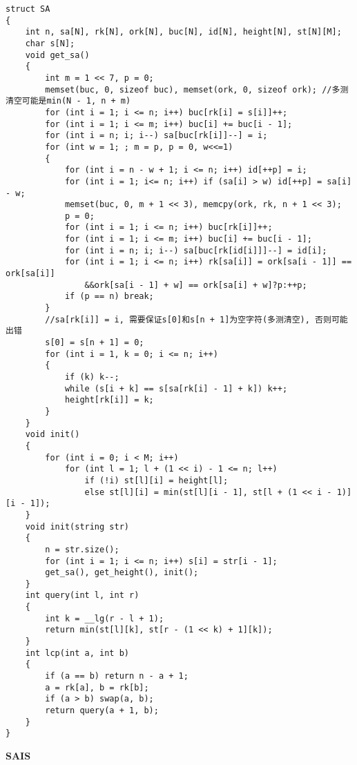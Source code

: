 \documentclass[a4paper, fontset=none]{ctexart}
\begin{document}
\begin{verbatim}
struct SA
{
    int n, sa[N], rk[N], ork[N], buc[N], id[N], height[N], st[N][M];
    char s[N];
    void get_sa()
    {
        int m = 1 << 7, p = 0;
        memset(buc, 0, sizeof buc), memset(ork, 0, sizeof ork); //多测清空可能是min(N - 1, n + m)
        for (int i = 1; i <= n; i++) buc[rk[i] = s[i]]++;
        for (int i = 1; i <= m; i++) buc[i] += buc[i - 1];
        for (int i = n; i; i--) sa[buc[rk[i]]--] = i;
        for (int w = 1; ; m = p, p = 0, w<<=1)
        {
            for (int i = n - w + 1; i <= n; i++) id[++p] = i;
            for (int i = 1; i<= n; i++) if (sa[i] > w) id[++p] = sa[i] - w;
            memset(buc, 0, m + 1 << 3), memcpy(ork, rk, n + 1 << 3);
            p = 0;
            for (int i = 1; i <= n; i++) buc[rk[i]]++;
            for (int i = 1; i <= m; i++) buc[i] += buc[i - 1];
            for (int i = n; i; i--) sa[buc[rk[id[i]]]--] = id[i];
            for (int i = 1; i <= n; i++) rk[sa[i]] = ork[sa[i - 1]] == ork[sa[i]]
                &&ork[sa[i - 1] + w] == ork[sa[i] + w]?p:++p;
            if (p == n) break;
        }
        //sa[rk[i]] = i, 需要保证s[0]和s[n + 1]为空字符(多测清空), 否则可能出错
        s[0] = s[n + 1] = 0;
        for (int i = 1, k = 0; i <= n; i++)
        {
            if (k) k--;
            while (s[i + k] == s[sa[rk[i] - 1] + k]) k++;
            height[rk[i]] = k;
        }
    }
    void init()
    {
        for (int i = 0; i < M; i++)
            for (int l = 1; l + (1 << i) - 1 <= n; l++)
                if (!i) st[l][i] = height[l];
                else st[l][i] = min(st[l][i - 1], st[l + (1 << i - 1)][i - 1]);
    }
    void init(string str)
    {
        n = str.size();
        for (int i = 1; i <= n; i++) s[i] = str[i - 1];
        get_sa(), get_height(), init();
    }
    int query(int l, int r)
    {
        int k = __lg(r - l + 1);
        return min(st[l][k], st[r - (1 << k) + 1][k]);
    }
    int lcp(int a, int b)
    {
        if (a == b) return n - a + 1;
        a = rk[a], b = rk[b];
        if (a > b) swap(a, b);
        return query(a + 1, b);
    }
}
\end{verbatim}

\textbf{SAIS}
\end{document}
